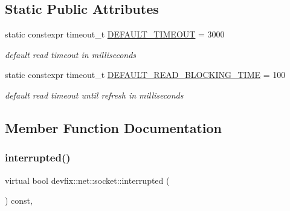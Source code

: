 \subsection*{Static Public Attributes}
\begin{DoxyCompactItemize}
\item 
\mbox{\label{structdevfix_1_1net_1_1socket_a1bd6468be497aed208ad6d5632683a5d}} 
static constexpr timeout\+\_\+t \hyperlink{structdevfix_1_1net_1_1socket_a1bd6468be497aed208ad6d5632683a5d}{D\+E\+F\+A\+U\+L\+T\+\_\+\+T\+I\+M\+E\+O\+UT} = 3000
\begin{DoxyCompactList}\small\item\em default read timeout in milliseconds \end{DoxyCompactList}\item 
\mbox{\label{structdevfix_1_1net_1_1socket_a77c3214eb436d06825a4cc2aafcc63ce}} 
static constexpr timeout\+\_\+t \hyperlink{structdevfix_1_1net_1_1socket_a77c3214eb436d06825a4cc2aafcc63ce}{D\+E\+F\+A\+U\+L\+T\+\_\+\+R\+E\+A\+D\+\_\+\+B\+L\+O\+C\+K\+I\+N\+G\+\_\+\+T\+I\+ME} = 100
\begin{DoxyCompactList}\small\item\em default read timeout until refresh in milliseconds \end{DoxyCompactList}\end{DoxyCompactItemize}


\subsection{Member Function Documentation}
\mbox{\label{structdevfix_1_1net_1_1socket_a7cfe151f1124d46fb19fad0c374c9352}} 
\subsubsection{\texorpdfstring{interrupted()}{interrupted()}}
{\footnotesize\ttfamily virtual bool devfix\+::net\+::socket\+::interrupted (\begin{DoxyParamCaption}{ }\end{DoxyParamCaption}) const\hspace{0.3cm}{\ttfamily [pure virtual]}, {\ttfamily [noexcept]}}

